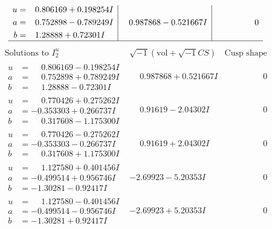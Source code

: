 \documentclass[1p]{elsarticle_modified}
\theoremstyle{definition}
\newcommand{\I}{\sqrt{-1}}
\begin{document}
$$\begin{array}{c|c|c}
\begin{aligned}
u &= \phantom{-}0.806169 + 0.198254 I \\
a &= \phantom{-}0.752898 - 0.789249 I \\
b &= \phantom{-}1.28888 + 0.72301 I\end{aligned}
 & \phantom{-}0.987868 - 0.521667 I & \phantom{-0.000000 } 0\\
 \hline 
 \end{array}$$\newpage$$\begin{array}{c|c|c}  
\text{Solutions to }I^u_{2}& \I (\text{vol} + \sqrt{-1}CS) & \text{Cusp shape}\\
 \hline 
\begin{aligned}
u &= \phantom{-}0.806169 - 0.198254 I \\
a &= \phantom{-}0.752898 + 0.789249 I \\
b &= \phantom{-}1.28888 - 0.72301 I\end{aligned}
 & \phantom{-}0.987868 + 0.521667 I & \phantom{-0.000000 } 0 \\ \hline\begin{aligned}
u &= \phantom{-}0.770426 + 0.275262 I \\
a &= -0.353303 + 0.266737 I \\
b &= \phantom{-}0.317608 - 1.175300 I\end{aligned}
 & \phantom{-}0.91619 - 2.04302 I & \phantom{-0.000000 } 0 \\ \hline\begin{aligned}
u &= \phantom{-}0.770426 - 0.275262 I \\
a &= -0.353303 - 0.266737 I \\
b &= \phantom{-}0.317608 + 1.175300 I\end{aligned}
 & \phantom{-}0.91619 + 2.04302 I & \phantom{-0.000000 } 0 \\ \hline\begin{aligned}
u &= \phantom{-}1.127580 + 0.401456 I \\
a &= -0.499514 + 0.956746 I \\
b &= -1.30281 - 0.92417 I\end{aligned}
 & -2.69923 - 5.20353 I & \phantom{-0.000000 } 0 \\ \hline\begin{aligned}
u &= \phantom{-}1.127580 - 0.401456 I \\
a &= -0.499514 - 0.956746 I \\
b &= -1.30281 + 0.92417 I\end{aligned}
 & -2.69923 + 5.20353 I & \phantom{-0.000000 } 0 \\ \hline\begin{aligned}

\end{aligned}
\end{array}$$
\end{document}
